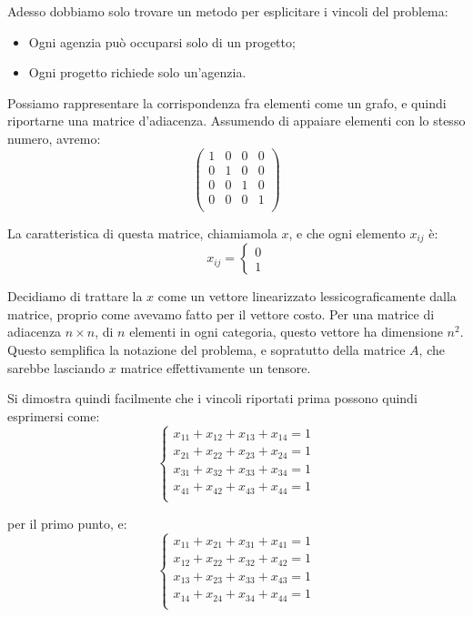 \documentclass[a4paper,11pt]{article}
\begin{document}
Adesso dobbiamo solo trovare un metodo per esplicitare i vincoli del problema:
\begin{itemize}
	\item Ogni agenzia può occuparsi solo di un progetto;
	\item Ogni progetto richiede solo un'agenzia.
\end{itemize}

Possiamo rappresentare la corrispondenza fra elementi come un grafo, e quindi riportarne una matrice d'adiacenza.
Assumendo di appaiare elementi con lo stesso numero, avremo:
$$
\begin{pmatrix}
	1 & 0 & 0 & 0 \\ 
	0 & 1 & 0 & 0 \\ 
	0 & 0 & 1 & 0 \\ 
	0 & 0 & 0 & 1 \\ 
\end{pmatrix}
$$

La caratteristica di questa matrice, chiamiamola $x$, e che ogni elemento $x_{ij}$ è:
$$
x_{ij} = 
	\begin{cases}
		0 \\ 1	
	\end{cases}
$$

Decidiamo di trattare la $x$ come un vettore linearizzato lessicograficamente dalla matrice, proprio come avevamo fatto per il vettore costo.
Per una matrice di adiacenza $n \times n$, di $n$ elementi in ogni categoria, questo vettore ha dimensione $n^2$. 
Questo semplifica la notazione del problema, e sopratutto della matrice $A$, che sarebbe lasciando $x$ matrice effettivamente un tensore.

Si dimostra quindi facilmente che i vincoli riportati prima possono quindi esprimersi come:
\[
	\begin{cases}
		x_{11} + x_{12} + x_{13} + x_{14} = 1	\\
		x_{21} + x_{22} + x_{23} + x_{24} = 1 \\ 
		x_{31} + x_{32} + x_{33} + x_{34} = 1 \\ 
		x_{41} + x_{42} + x_{43} + x_{44} = 1 \\ 
	\end{cases}
\]

per il primo punto, e:
\[
	\begin{cases}
		x_{11} + x_{21} + x_{31} + x_{41} = 1	\\
		x_{12} + x_{22} + x_{32} + x_{42} = 1 \\ 
		x_{13} + x_{23} + x_{33} + x_{43} = 1 \\ 
		x_{14} + x_{24} + x_{34} + x_{44} = 1 \\ 
	\end{cases}
\]
\end{document}
